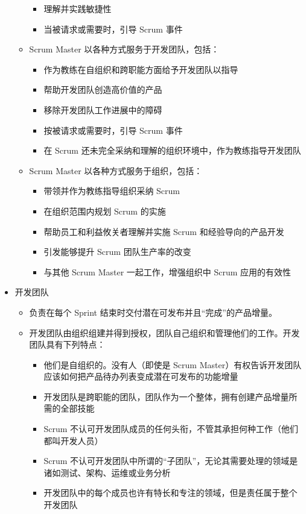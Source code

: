 \begin{itemize}
\begin{itemize}
\begin{itemize}
            \item 理解并实践敏捷性
            \item 当被请求或需要时，引导 Scrum 事件
        \end{itemize}
        \item Scrum Master 以各种方式服务于开发团队，包括：
        \begin{itemize}
            \item 作为教练在自组织和跨职能方面给予开发团队以指导
            \item 帮助开发团队创造高价值的产品
            \item 移除开发团队工作进展中的障碍
            \item 按被请求或需要时，引导 Scrum 事件
            \item 在 Scrum 还未完全采纳和理解的组织环境中，作为教练指导开发团队
        \end{itemize}
        \item Scrum Master 以各种方式服务于组织，包括：
        \begin{itemize}
            \item 带领并作为教练指导组织采纳 Scrum
            \item 在组织范围内规划 Scrum 的实施
            \item 帮助员工和利益攸关者理解并实施 Scrum 和经验导向的产品开发
            \item 引发能够提升 Scrum 团队生产率的改变
            \item 与其他 Scrum Master 一起工作，增强组织中 Scrum 应用的有效性
        \end{itemize}
    \end{itemize}
    \item 开发团队
    \begin{itemize}
        \item 负责在每个 Sprint 结束时交付潜在可发布并且“完成”的产品增量。
        \item 开发团队由组织组建并得到授权，团队自己组织和管理他们的工作。开发团队具有下列特点：
        \begin{itemize}
            \item 他们是自组织的。没有人（即使是 Scrum Master）有权告诉开发团队应该如何把产品待办列表变成潜在可发布的功能增量
            \item 开发团队是跨职能的团队，团队作为一个整体，拥有创建产品增量所需的全部技能
            \item Scrum 不认可开发团队成员的任何头衔，不管其承担何种工作（他们都叫开发人员）
            \item Scrum 不认可开发团队中所谓的“子团队”，无论其需要处理的领域是诸如测试、架构、运维或业务分析
            \item 开发团队中的每个成员也许有特长和专注的领域，但是责任属于整个开发团队
        \end{itemize}
    \end{itemize}
\end{itemize}

